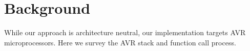 \vspace{-15pt}
\section{Background}\label{sec:background}
\vspace{-10pt}
While our approach is architecture neutral, our implementation targets AVR microprocessors. Here we survey the AVR stack and function call process.

\begin{comment}

\subsection{Stack Frame}
The stack consists of stack frames, each corresponding to a function call. A stack frame is created when a function is called and freed when the function returns. 
\begin{wrapfigure}{l}{0.38\textwidth}
	\vspace{-30pt}
	\begin{center}
		\texttt{[image: figures/stack\_frame\_v3.pdf]}
	\end{center}
	\vspace{-20pt}
	\caption{AVR Stack Frame}\label{fig:stack_frame}
	\vspace{-20pt}
\end{wrapfigure}
For example, as shown in Figure \ref{fig:stack_frame}, when the \textit{main} function calls the \textit{foo} function, a stack frame will be created for \textit{foo}. First, the return address of \textit{main} will be pushed to the stack, followed by the conflict registers. Next, the local variables and arguments will be pushed to the stack in reverse order of declaration. The stack frame spans the return address through the first argument. The stack frame pointer, Y, now points to the next available address in the stack. When \textit{foo} finishes execution, the stack frame will be freed, and the stack frame pointer will point back to the position where the return address of the previous stack frame was stored.

\end{comment}
\vspace{-15pt}

